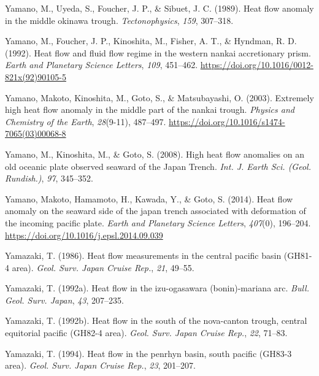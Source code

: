 \documentclass[draft,linenumbers]{agujournal2018}
\begin{document}
\leavevmode{}%
Yamano, M., Uyeda, S., Foucher, J. P., \& Sibuet, J. C. (1989). Heat
flow anomaly in the middle okinawa trough. \emph{Tectonophysics},
\emph{159}, 307--318.

\leavevmode{}%
Yamano, M., Foucher, J. P., Kinoshita, M., Fisher, A. T., \& Hyndman, R.
D. (1992). Heat flow and fluid flow regime in the western nankai
accretionary prism. \emph{Earth and Planetary Science Letters},
\emph{109}, 451--462. \url{https://doi.org/10.1016/0012-821x(92)90105-5}

\leavevmode{}%
Yamano, Makoto, Kinoshita, M., Goto, S., \& Matsubayashi, O. (2003).
Extremely high heat flow anomaly in the middle part of the nankai
trough. \emph{Physics and Chemistry of the Earth}, \emph{28}(9-11),
487--497. \url{https://doi.org/10.1016/s1474-7065(03)00068-8}

\leavevmode{}%
Yamano, M., Kinoshita, M., \& Goto, S. (2008). High heat flow anomalies
on an old oceanic plate observed seaward of the {Japan Trench}.
\emph{Int. J. Earth Sci. (Geol. Rundish.)}, \emph{97}, 345--352.

\leavevmode{}%
Yamano, Makoto, Hamamoto, H., Kawada, Y., \& Goto, S. (2014). Heat flow
anomaly on the seaward side of the japan trench associated with
deformation of the incoming pacific plate. \emph{Earth and Planetary
Science Letters}, \emph{407}(0), 196--204.
\url{https://doi.org/10.1016/j.epsl.2014.09.039}

\leavevmode{}%
Yamazaki, T. (1986). Heat flow measurements in the central pacific basin
(GH81-4 area). \emph{Geol. Surv. Japan Cruise Rep.}, \emph{21}, 49--55.

\leavevmode{}%
Yamazaki, T. (1992a). Heat flow in the izu-ogasawara (bonin)-mariana
arc. \emph{Bull. Geol. Surv. Japan}, \emph{43}, 207--235.

\leavevmode{}%
Yamazaki, T. (1992b). Heat flow in the south of the nova-canton trough,
central equitorial pacific (GH82-4 area). \emph{Geol. Surv. Japan Cruise
Rep.}, \emph{22}, 71--83.

\leavevmode{}%
Yamazaki, T. (1994). Heat flow in the penrhyn basin, south pacific
(GH83-3 area). \emph{Geol. Surv. Japan Cruise Rep.}, \emph{23},
201--207.
\end{document}
